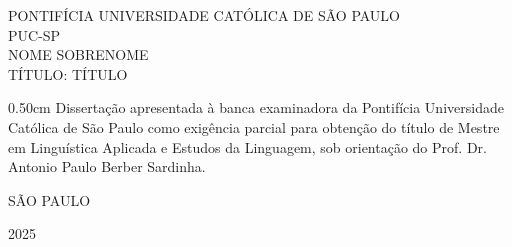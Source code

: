 \begin{titlepage}
    \begin{center}
        {\large \MakeUppercase{Pontifícia Universidade Católica de São Paulo}} \\
        {\large \MakeUppercase{PUC-SP}} \\
        \vspace{5cm}
        {\large \MakeUppercase{Nome Sobrenome}} \\
        \vspace{5cm}
        {\Large \MakeUppercase{Título: título}} \\
        \vspace{3cm}
        \begin{adjustwidth}{0.5\textwidth}{0cm}
            Dissertação apresentada à banca examinadora da Pontifícia Universidade Católica de São Paulo como exigência parcial para obtenção do título de Mestre em Linguística Aplicada e Estudos da Linguagem, sob orientação do Prof. Dr. Antonio Paulo Berber Sardinha.
        \end{adjustwidth}
        \vfill
        {\large \MakeUppercase{São Paulo}}
        
        {\large 2025}
    \end{center}
\end{titlepage}

